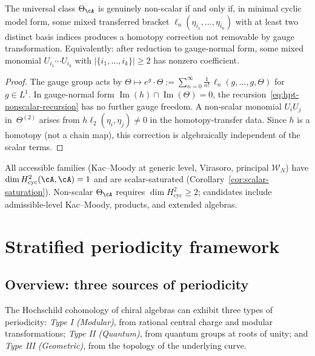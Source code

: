 \begin{proposition}
\label{prop:non-scalar-criterion}
The universal class $\Theta_\cA$ is genuinely non-scalar
if and only if, in minimal cyclic model form, some mixed
transferred bracket
$\ell_n(\eta_{i_1}, \ldots, \eta_{i_n})$ with at least two
distinct basis indices produces a homotopy correction not
removable by gauge transformation.
Equivalently: after reduction to gauge-normal form,
some mixed monomial
$U_{i_1} \cdots U_{i_k}$ with $|\{i_1, \ldots, i_k\}| \geq 2$
has nonzero coefficient.
\end{proposition}

\begin{proof}
The gauge group acts by
$\Theta \mapsto e^{g} \cdot \Theta :=
\sum_{n=0}^\infty \frac{1}{n!}\, \ell_n(g, \ldots, g, \Theta)$
for $g \in L^1$.  In gauge-normal form
$\operatorname{Im}(h) \cap \operatorname{Im}(\Theta) = 0$,
the recursion~\eqref{eq:hpt-nonscalar-recursion} has no
further gauge freedom.  A non-scalar monomial $U_i U_j$
in~$\Theta^{(2)}$ arises from
$h\ell_2(\eta_i, \eta_j) \neq 0$ in the homotopy-transfer
data.  Since $h$ is a homotopy (not a chain map), this
correction is algebraically independent of the scalar terms.
\end{proof}

\begin{remark}
\label{rem:non-scalar-landscape}
All accessible families (Kac--Moody at generic level, Virasoro, principal $\mathcal{W}_N$) have $\dim H^2_{\mathrm{cyc}}(\cA,\cA) = 1$ and are scalar-saturated (Corollary~\ref{cor:scalar-saturation}).  Non-scalar $\Theta_\cA$ requires $\dim H^2_{\mathrm{cyc}} \geq 2$; candidates include admissible-level Kac--Moody, products, and extended algebras.
\end{remark}

\section{Stratified periodicity framework}

\subsection{Overview: three sources of periodicity}

The Hochschild cohomology of chiral algebras can exhibit three types of periodicity: \emph{Type I (Modular)}, from rational central charge and modular transformations; \emph{Type II (Quantum)}, from quantum groups at roots of unity; and \emph{Type III (Geometric)}, from the topology of the underlying curve.

